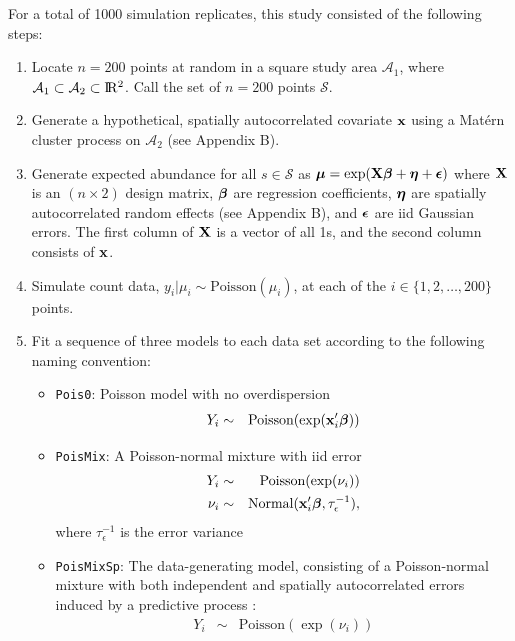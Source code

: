 \documentclass[12pt,english]{article}
\begin{document}
\begin{spacing}{1.9}
For a total of 1000 simulation replicates, this study consisted of the
following steps:
\begin{enumerate}
\item Locate $n=200$ points at random in a square study area
  $\mathcal{A}_1$, where
  $\mathcal{A}_1 \subset \mathcal{A}_2 \subset \R2$.  Call the set of
  $n=200$ points $\mathcal{S}$.
\item Generate a hypothetical, spatially autocorrelated covariate
  ${\bf x}$ using a Mat\'{e}rn cluster process on $\mathcal{A}_2$ (see
  Appendix B).
\item Generate expected abundance for all $s \in \mathcal{S}$ as
  $\boldsymbol{\mu} = \exp( {\bf X}\boldsymbol{\beta} + \boldsymbol{\eta} +\boldsymbol{\epsilon} )$ where
  ${\bf X}$ is an $(n \times 2)$ design matrix, $\boldsymbol{\beta}$ are
  regression coefficients, $\boldsymbol{\eta}$ are spatially autocorrelated
  random effects (see Appendix B), and $\boldsymbol{\epsilon}$ are iid Gaussian
  errors.  The first column of ${\bf X}$ is a vector of all 1s, and
  the second column consists of ${\bf x}$.
\item Simulate count data, $y_i|\mu_i \sim \textrm{Poisson}(\mu_i)$,
  at each of the $i \in \{ 1,2,\hdots,200 \}$ points.
\item Fit a sequence of three models to each data set according to the
  following naming convention:
  \begin{itemize}
  \item \texttt{Pois0}: Poisson model with no overdispersion
    \begin{eqnarray*}
      Y_i & \sim & \textrm{Poisson}(\exp({\bf x}_i^\prime \boldsymbol{\beta})) \\
    \end{eqnarray*}
  \item \texttt{PoisMix}: A Poisson-normal mixture with iid error
    \begin{eqnarray*}
      Y_i & \sim & \textrm{Poisson}(\exp(\nu_i)) \\
      \nu_i & \sim & \textrm{Normal}({\bf x}_i^\prime \boldsymbol{\beta}, \tau_\epsilon^{-1}),\\
    \end{eqnarray*}
    where $\tau_\epsilon^{-1}$ is the error variance
  \item \texttt{PoisMixSp}: The data-generating model, consisting of a
    Poisson-normal mixture with both independent and spatially
    autocorrelated errors induced by a predictive process
    \citep[cf.][]{BanerjeeEtAl2008}:
    \begin{eqnarray*}
      Y_i & \sim & \textrm{Poisson}(\exp(\nu_i)) \\

\end{eqnarray*}
\end{itemize}
\end{enumerate}
\end{spacing}
\end{document}
